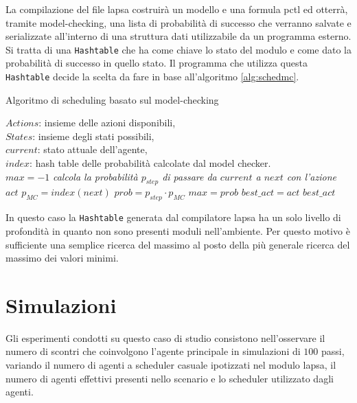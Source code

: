 La compilazione del file \ac{lapsa} costruirà un modello \prism{} e una formula \ac{pctl} ed otterrà, tramite model-checking, una lista di probabilità di successo che verranno salvate e serializzate all'interno di una struttura dati utilizzabile da un programma \java{} esterno. Si tratta di una \texttt{Hashtable} che ha come chiave lo stato del modulo e come dato la probabilità di successo in quello stato. Il programma \java{} che utilizza questa \texttt{Hashtable} decide la scelta da fare in base all'algoritmo \ref{alg:schedmc}.
\begin{algorithm}
	\caption{Algoritmo di scheduling basato sul model-checking}
	\label{alg:schedmc}
	\begin{algorithmic}
		\REQUIRE
			$Actions$: insieme delle azioni disponibili, \\
			$States$: insieme degli stati possibili, \\
			$current$: stato attuale dell'agente, \\
			$index$: hash table delle probabilità calcolate dal model checker. \\
		\STATE $max = -1$
				\STATE \emph{calcola la probabilità $p_{step}$ di passare da $current$ a $next$ con l'azione $act$}
				\STATE $p_{MC} = index(next)$
				\STATE $prob = p_{step}\cdot p_{MC}$
					\STATE $max = prob$
					\STATE $best\_act = act$
				\ENDIF
			\ENDFOR
		\ENDFOR
		\RETURN $best\_act$
	\end{algorithmic}
\end{algorithm}
In questo caso la \texttt{Hashtable} generata dal compilatore \ac{lapsa} ha un solo livello di profondità in quanto non sono presenti moduli nell'ambiente. Per questo motivo è sufficiente una semplice ricerca del massimo al posto della più generale ricerca del massimo dei valori minimi.

\section{Simulazioni}
Gli esperimenti condotti su questo caso di studio consistono nell'osservare il numero di scontri che coinvolgono l'agente principale in simulazioni di $100$ passi, variando il numero di agenti a scheduler casuale ipotizzati nel modulo \ac{lapsa}, il numero di agenti effettivi presenti nello scenario e lo scheduler utilizzato dagli agenti.

